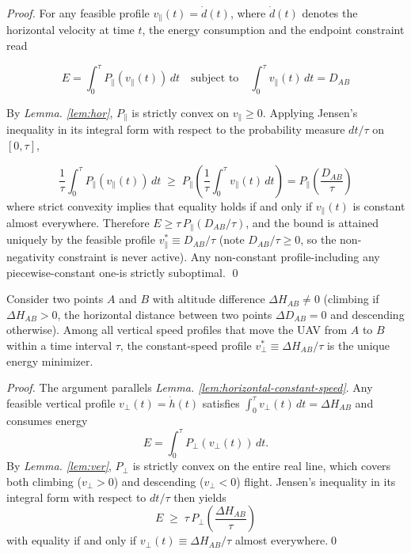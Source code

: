 \begin{proof}
    For any feasible profile $v_{\parallel}(t) = \dot{d}(t)$, where $\dot{d}(t)$ denotes the horizontal velocity at time $t$, the energy consumption and the endpoint constraint read
    
    \begin{equation}
    E = \int_{0}^{\tau} P_{\parallel}(v_{\parallel}(t))\,dt \quad \text{subject to} \quad \int_{0}^{\tau} v_{\parallel}(t)\,dt = D_{AB}
    \label{eq:lem3}
    \end{equation}
    
    By \textit{Lemma. \ref{lem:hor}}, $P_{\parallel}$ is strictly convex on $v_{\parallel} \ge 0$.
    Applying Jensen's inequality in its integral form with respect to the probability measure $dt/\tau$ on $[0, \tau]$,

    \begin{equation}
        \frac{1}{\tau}\int_{0}^{\tau} P_{\parallel}(v_{\parallel}(t))\,dt \;\ge\; P_{\parallel}\!\left(\frac{1}{\tau}\int_{0}^{\tau} v_{\parallel}(t)\,dt\right) = P_{\parallel}\!\left(\frac{D_{AB}}{\tau}\right)
        \label{eq:lem3-jensen}
    \end{equation}
    where strict convexity implies that equality holds if and only if $v_{\parallel}(t)$ is constant almost everywhere.
    Therefore $E \ge \tau\, P_{\parallel}(D_{AB}/\tau)$, and the bound is attained uniquely by the feasible profile $v_{\parallel}^{*} \equiv D_{AB}/\tau$ (note $D_{AB}/\tau \ge 0$, so the non-negativity constraint is never active).
    Any non-constant profile-including any piecewise-constant one-is strictly suboptimal.
\qed
\end{proof}

\begin{lemma}
\label{lem:vertical-constant-speed}
Consider two points $A$ and $B$ with altitude difference $\Delta H_{AB} \neq 0$ (climbing if $\Delta H_{AB} > 0$, the horizontal distance between two points $\Delta D_{AB} = 0$ and descending otherwise).
Among all vertical speed profiles that move the UAV from $A$ to $B$ within a time interval  $\tau$, the constant-speed profile $v_{\perp}^{*} \equiv \Delta H_{AB}/\tau$ is the unique energy minimizer.
\end{lemma}

\begin{proof}
    The argument parallels \textit{Lemma. \ref{lem:horizontal-constant-speed}}.
    Any feasible vertical profile $v_{\perp}(t) = \dot{h}(t)$ satisfies $\int_{0}^{\tau} v_{\perp}(t)\,dt = \Delta H_{AB}$ and consumes energy 
    \[E = \int_{0}^{\tau} P_{\perp}(v_{\perp}(t))\,dt.\]
    By \textit{Lemma. \ref{lem:ver}}, $P_{\perp}$ is strictly convex on the entire real line, which covers both climbing ($v_{\perp} > 0$) and descending ($v_{\perp} < 0$) flight.
    Jensen's inequality in its integral form with respect to $dt/\tau$ then yields
    \[
    E \;\ge\; \tau\, P_{\perp}\!\left(\frac{\Delta H_{AB}}{\tau}\right)
    \]
    with equality if and only if $v_{\perp}(t) \equiv \Delta H_{AB}/\tau$ almost everywhere.\qed
\end{proof}

